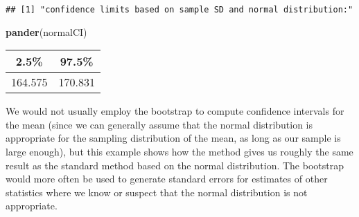 \documentclass[]{book}
\newenvironment{Shaded}{\begin{snugshade}}{\end{snugshade}}
\newcommand{\KeywordTok}[1]{\textcolor[rgb]{0.13,0.29,0.53}{\textbf{#1}}}
\newcommand{\FloatTok}[1]{\textcolor[rgb]{0.00,0.00,0.81}{#1}}
\newcommand{\StringTok}[1]{\textcolor[rgb]{0.31,0.60,0.02}{#1}}
\newcommand{\CommentTok}[1]{\textcolor[rgb]{0.56,0.35,0.01}{\textit{#1}}}
\newcommand{\OperatorTok}[1]{\textcolor[rgb]{0.81,0.36,0.00}{\textbf{#1}}}
\newcommand{\NormalTok}[1]{#1}
\theoremstyle{definition}
\theoremstyle{definition}
\theoremstyle{definition}
\theoremstyle{remark}
\begin{document}
\begin{Shaded}
\end{Shaded}

\begin{verbatim}
## [1] "confidence limits based on sample SD and normal distribution:"
\end{verbatim}

\begin{Shaded}
\begin{Highlighting}[]
\KeywordTok{pander}\NormalTok{(normalCI)}
\end{Highlighting}
\end{Shaded}

\begin{longtable}[]{@{}cc@{}}
\toprule
\begin{minipage}[b]{0.13\columnwidth}\centering\strut
2.5\%\strut
\end{minipage} & \begin{minipage}[b]{0.13\columnwidth}\centering\strut
97.5\%\strut
\end{minipage}\tabularnewline
\midrule
\endhead
\begin{minipage}[t]{0.13\columnwidth}\centering\strut
164.575\strut
\end{minipage} & \begin{minipage}[t]{0.13\columnwidth}\centering\strut
170.831\strut
\end{minipage}\tabularnewline
\bottomrule
\end{longtable}

We would not usually employ the bootstrap to compute confidence
intervals for the mean (since we can generally assume that the normal
distribution is appropriate for the sampling distribution of the mean,
as long as our sample is large enough), but this example shows how the
method gives us roughly the same result as the standard method based on
the normal distribution. The bootstrap would more often be used to
generate standard errors for estimates of other statistics where we know
or suspect that the normal distribution is not appropriate.
\end{document}
